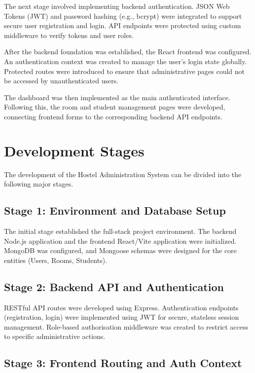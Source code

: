 The next stage involved implementing backend authentication. JSON Web Tokens (JWT) and password hashing (e.g., bcrypt) were integrated to support secure user registration and login. API endpoints were protected using custom middleware to verify tokens and user roles.

After the backend foundation was established, the React frontend was configured. An authentication context was created to manage the user's login state globally. Protected routes were introduced to ensure that administrative pages could not be accessed by unauthenticated users.

The dashboard was then implemented as the main authenticated interface. Following this, the room and student management pages were developed, connecting frontend forms to the corresponding backend API endpoints.

\section{Development Stages}

The development of the Hostel Administration System can be divided into the following major stages.

\subsection{Stage 1: Environment and Database Setup}

The initial stage established the full-stack project environment. The backend Node.js application and the frontend React/Vite application were initialized. MongoDB was configured, and Mongoose schemas were designed for the core entities (Users, Rooms, Students).

\subsection{Stage 2: Backend API and Authentication}

RESTful API routes were developed using Express. Authentication endpoints (registration, login) were implemented using JWT for secure, stateless session management. Role-based authorisation middleware was created to restrict access to specific administrative actions.

\subsection{Stage 3: Frontend Routing and Auth Context}

